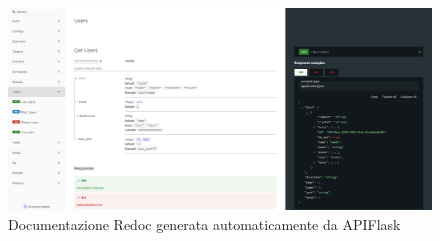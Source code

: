 \begin{figure}
\includegraphics[width=\textwidth]{img/redoc.png}
\caption{Documentazione Redoc generata automaticamente da APIFlask}
\end{figure}